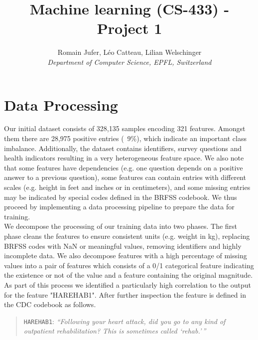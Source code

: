 \documentclass[10pt,conference,compsocconf]{IEEEtran}
\begin{document}
\title{Machine learning (CS-433) - Project 1}

\author{
  Romain Jufer, Léo Catteau, Lilian Welschinger \\
  \textit{Department of Computer Science, EPFL, Switzerland}
}

\maketitle

\section{Data Processing}

Our initial dataset consists of 328,135 samples encoding 321 features. Amongst them there are 28,975 positive entries (~9\%), which indicate an important class imbalance. Additionally, the dataset contains identifiers, survey questions and health indicators
resulting in a very heterogeneous feature space. We also note that some features have dependencies (e.g. one question depends on a positive answer to a previous question), some features can contain entries with different scales
(e.g. height in feet and inches or in centimeters), and some missing entries may be indicated by special codes defined in the BRFSS codebook. We thus proceed by implementing a data processing pipeline to prepare the data for training. \\

We decompose the processing of our training data into two phases. The first phase cleans the features to ensure consistent
units (e.g. weight in kg), replacing BRFSS codes with NaN or meaningful values, removing identifiers and highly incomplete data. We also decompose features with a high percentage
of missing values into a pair of features which consists of a 0/1 categorical feature indicating the existence or not of the value and a feature containing the original magnitude. \\

As part of this process we identified a particularly high correlation to the output for the feature "HAREHAB1". After further inspection 
the feature is defined in the CDC codebook as follows.

\vspace{0.5em}
\begin{quote}
  \texttt{HAREHAB1}: \emph{``Following your heart attack, did you go to any kind of
  outpatient rehabilitation? This is sometimes called `rehab.'\,''}
\end{quote}
\vspace{0.5em}
\end{document}
